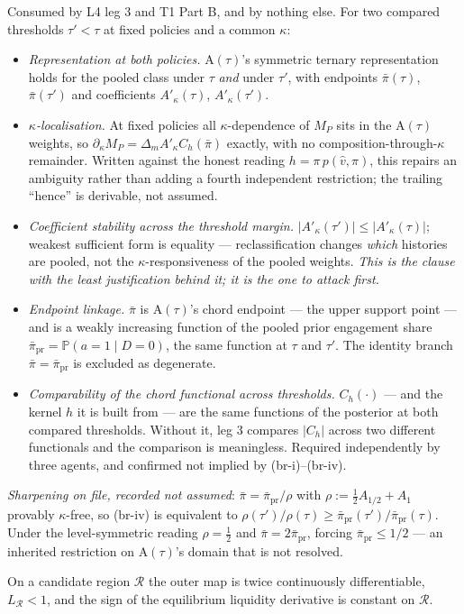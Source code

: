 \documentclass[11pt,a4paper]{article}
\newcommand{\Prb}{\mathbb{P}}
\newcommand{\Atau}{\mathrm{A}(\tau)}
\newcommand{\Abr}{\mathrm{A}(\mathrm{br})}
\newcommand{\Akap}{A'_{\kappa}}
\begin{document}
\begin{description}[leftmargin=1.9em,style=unboxed]
\item[$\Abr$ Chord--sensitivity bridge.] Consumed by L4 leg 3 and T1 Part B, and by
  nothing else. For two compared thresholds $\tau'<\tau$ at fixed policies and a
  common $\kappa$:
  \begin{itemize}
  \item[(br-i)] \emph{Representation at both policies.} $\Atau$'s symmetric ternary
    representation holds for the pooled class under $\tau$ \emph{and} under $\tau'$,
    with endpoints $\bar\pi(\tau)$, $\bar\pi(\tau')$ and coefficients
    $\Akap(\tau)$, $\Akap(\tau')$.
  \item[(br-ii)] \emph{$\kappa$-localisation.} At fixed policies all
    $\kappa$-dependence of $M_P$ sits in the $\Atau$ weights, so
    $\partial_\kappa M_P=\Delta_m\Akap C_h(\bar\pi)$ exactly, with no
    composition-through-$\kappa$ remainder. Written against the honest reading
    $h=\pi\,p(\hat v,\pi)$, this repairs an ambiguity rather than adding a fourth
    independent restriction; the trailing ``hence'' is derivable, not assumed.
  \item[(br-iii)] \emph{Coefficient stability across the threshold margin.}
    $|\Akap(\tau')|\le|\Akap(\tau)|$; weakest sufficient form is equality ---
    reclassification changes \emph{which} histories are pooled, not the
    $\kappa$-responsiveness of the pooled weights. \emph{This is the clause with the
    least justification behind it; it is the one to attack first.}
  \item[(br-iv)] \emph{Endpoint linkage.} $\bar\pi$ is $\Atau$'s chord endpoint ---
    the upper support point --- and is a weakly increasing function of the pooled
    prior engagement share $\bar\pi_{\mathrm{pr}}=\Prb(a=1\mid D=0)$, the same
    function at $\tau$ and $\tau'$. The identity branch
    $\bar\pi=\bar\pi_{\mathrm{pr}}$ is excluded as degenerate.
  \item[(br-v)] \emph{Comparability of the chord functional across thresholds.}
    $C_h(\cdot)$ --- and the kernel $h$ it is built from --- are the same functions
    of the posterior at both compared thresholds. Without it, leg 3 compares $|C_h|$
    across two different functionals and the comparison is meaningless. Required
    independently by three agents, and confirmed not implied by (br-i)--(br-iv).
  \end{itemize}
  \emph{Sharpening on file, recorded not assumed}: $\bar\pi=\bar\pi_{\mathrm{pr}}/\rho$
  with $\rho:=\tfrac12A_{1/2}+A_1$ provably $\kappa$-free, so (br-iv) is equivalent
  to $\rho(\tau')/\rho(\tau)\ge\bar\pi_{\mathrm{pr}}(\tau')/\bar\pi_{\mathrm{pr}}(\tau)$.
  Under the level-symmetric reading $\rho=\tfrac12$ and
  $\bar\pi=2\bar\pi_{\mathrm{pr}}$, forcing $\bar\pi_{\mathrm{pr}}\le1/2$ --- an
  inherited restriction on $\Atau$'s domain that is not resolved.

\item[AGE GE differentiability and contraction.] On a candidate region
  $\mathcal R$ the outer map is twice continuously differentiable,
  $L_{\mathcal R}<1$, and the sign of the equilibrium liquidity derivative is
  constant on $\mathcal R$.
\end{description}
\end{document}
